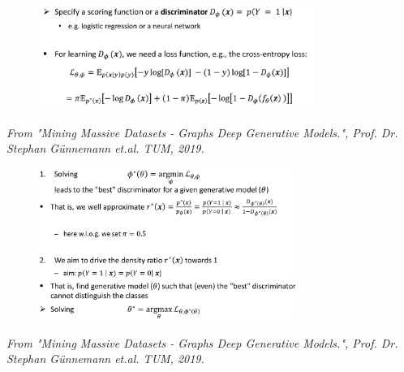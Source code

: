 \documentclass{tum-presentation}
\begin{document}
\begin{frame}
	\begin{figure}
		\centering
		\includegraphics[width=0.8\textwidth,keepaspectratio=true]{tum-resources/images/gan_6.png}
		\label{fig:gan_6}
	\end{figure}
\begin{flushright}
	\textit{	From "Mining Massive Datasets - Graphs Deep Generative Models.", Prof. Dr. Stephan Günnemann et.al. TUM, 2019. }
\end{flushright}
\end{frame}

\begin{frame}
	\begin{figure}
		\centering
		\includegraphics[width=0.75\textwidth,keepaspectratio=true]{tum-resources/images/gan_7.png}
		\label{fig:gan_7}
	\end{figure}
\begin{flushright}
	\textit{	From "Mining Massive Datasets - Graphs Deep Generative Models.", Prof. Dr. Stephan Günnemann et.al. TUM, 2019. }
\end{flushright}
\end{frame}
\end{document}
